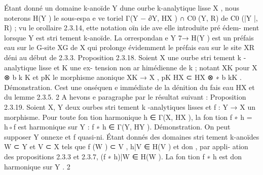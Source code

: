 \documentclass[
  10pt,
]{article}
\newenvironment{Shaded}{}{}
\newcommand{\NormalTok}[1]{#1}
\begin{document}
\begin{Shaded}
\begin{Highlighting}[]

\NormalTok{  Étant donné un domaine k{-}anoïde Y d\textquotesingle{}une ourbe k{-}analytique lisse X , nous noterons}
\NormalTok{H(Y ) le sous{-}espa e ve toriel}
\NormalTok{                                   Γ(Y − ∂Y, HX ) ∩ C0 (Y, R)}
\NormalTok{de C0 (|Y |, R) ; vu le orollaire 2.3.14, ette notation oïn ide ave elle introduite pré édem{-}}
\NormalTok{ment lorsque Y est stri tement k{-}anoïde.}
\NormalTok{   La orrespondan e Y 7→ H(Y ) est un préfais eau sur le G{-}site XG de X qui prolonge}
\NormalTok{évidemment le préfais eau sur le site XR déni au début de 2.3.3.}
\NormalTok{Proposition 2.3.18.  Soient X une ourbe stri tement k {-}analytique lisse et K une ex{-}}
\NormalTok{tension non ar himédienne de k ; notant XK pour X ⊗       b k K et pK le morphisme anonique}
\NormalTok{XK → X , pK HX ⊂ HX ⊗}
\NormalTok{              ∗}
\NormalTok{                          b kK .}
\NormalTok{Démonstration. C\textquotesingle{}est une onséquen e immédiate de la dénition du fais eau HX et du}
\NormalTok{lemme 2.3.5.                                                                                      2}
\NormalTok{   A hevons e paragraphe par le résultat suivant :}
\NormalTok{Proposition 2.3.19.  Soient X, Y deux ourbes stri tement k {-}analytiques lisses et f :}
\NormalTok{Y → X un morphisme. Pour toute fon tion harmonique h ∈ Γ(X, HX ), la fon tion f ∗ h = h◦f}
\NormalTok{est harmonique sur Y : f ∗ h ∈ Γ(Y, HY ).}
\NormalTok{Démonstration. On peut supposer Y onnexe et f quasi{-}ni. Étant donnés des domaines}
\NormalTok{stri tement k{-}anoïdes W ⊂ Y et V ⊂ X tels que f (W ) ⊂ V , h|V ∈ H(V ) et don , par appli{-}}
\NormalTok{ ation des propositions 2.3.3 et 2.3.7, (f ∗ h)|W ∈ H(W ). La fon tion f ∗ h est don harmonique}
\NormalTok{sur Y .                                                                                      2}


\end{Highlighting}
\end{Shaded}
\end{document}
